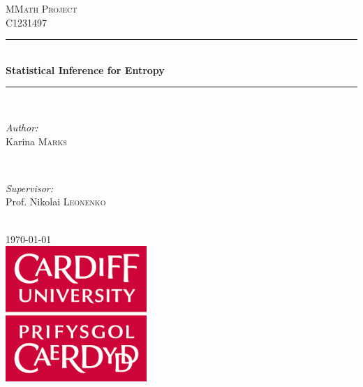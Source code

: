 \documentclass[12pt]{report}
\begin{document}
\begin{titlepage}
\newcommand{\HRule}{\rule{\linewidth}{0.5mm}} %

\center %

\textsc{\LARGE MMath Project}\\[1.5cm] %
\textsc{\Large C1231497}\\[0.5cm] %

\HRule \\[0.4cm]
{ \huge \bfseries Statistical Inference for Entropy}\\[0.4cm] %
\HRule \\[1.5cm]

\begin{minipage}{0.4\textwidth}
\begin{flushleft} \large
\emph{Author:}\\
Karina \textsc{Marks} %
\end{flushleft}
\end{minipage}
~
\begin{minipage}{0.4\textwidth}
\begin{flushright} \large
\emph{Supervisor:} \\
Prof. Nikolai \textsc{Leonenko} %
\end{flushright}
\end{minipage}\\[2cm]

{\large \today}\\[2cm] %

\includegraphics[width=0.4\textwidth]{logo.png}\\ %
 
\vfill 
\end{titlepage}
\end{document}
